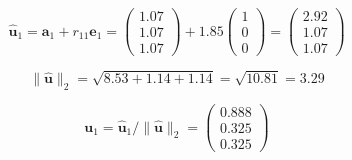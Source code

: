 \documentclass[a4paper,11pt]{article}
\begin{document}
\begin{equation}\label{key}
	\hat{\textbf{u}}_1  = \textbf{a}_1 + r_{11} \textbf{e}_1 = \begin{pmatrix}
		1.07\\
		1.07\\
		1.07
	\end{pmatrix} + 1.85 \begin{pmatrix}
	1\\
	0\\
	0
\end{pmatrix} = \begin{pmatrix}
2.92\\
1.07\\
1.07
\end{pmatrix}
\end{equation}

\begin{equation}\label{key}
	\lVert \hat{\textbf{u}} \rVert_2 = \sqrt{8.53 + 1.14 + 1.14} = \sqrt{10.81} = 3.29
\end{equation}

\begin{equation}\label{key}
		\textbf{u}_1 = 	\hat{\textbf{u}}_1/\lVert \hat{\textbf{u}} \rVert_2  =  \begin{pmatrix}
			0.888\\
			0.325\\
			0.325
		\end{pmatrix} 
\end{equation}
\end{document}
